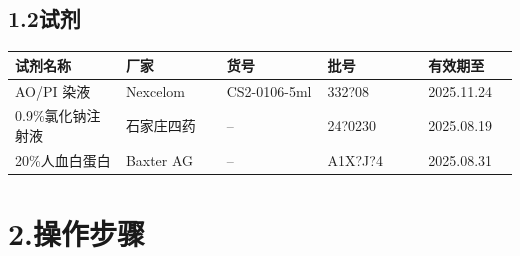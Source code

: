 \documentclass[UTF8,10pt,a4paper,fontset=fandol]{ctexart}
\newcommand{\fieldvalue}[1]{#1}
\newcommand{\handwritten}[1]{#1}
\begin{document}
\subsection*{1.2\quad 试剂}

\begin{center}
\small
\begin{tabular}{|p{0.22\linewidth}|p{0.20\linewidth}|p{0.20\linewidth}|p{0.20\linewidth}|p{0.18\linewidth}|}
\hline
试剂名称 & 厂家 & 货号 & 批号 & 有效期至\\
\hline
\fieldvalue{AO/PI 染液} &
\fieldvalue{Nexcelom} &
\fieldvalue{CS2-0106-5ml} &
\fieldvalue{\handwritten{332?08}} &
\fieldvalue{\handwritten{2025.11.24}}\\
\hline
\fieldvalue{0.9\%氯化钠注射液} &
\fieldvalue{石家庄四药} &
\fieldvalue{--} &
\fieldvalue{\handwritten{24?0230}} &
\fieldvalue{\handwritten{2025.08.19}}\\
\hline
\fieldvalue{20\%人血白蛋白} &
\fieldvalue{Baxter AG} &
\fieldvalue{--} &
\fieldvalue{\handwritten{A1X?J?4}} &
\fieldvalue{\handwritten{2025.08.31}}\\
\hline
\end{tabular}
\end{center}

\section*{2.\quad 操作步骤}
\end{document}
